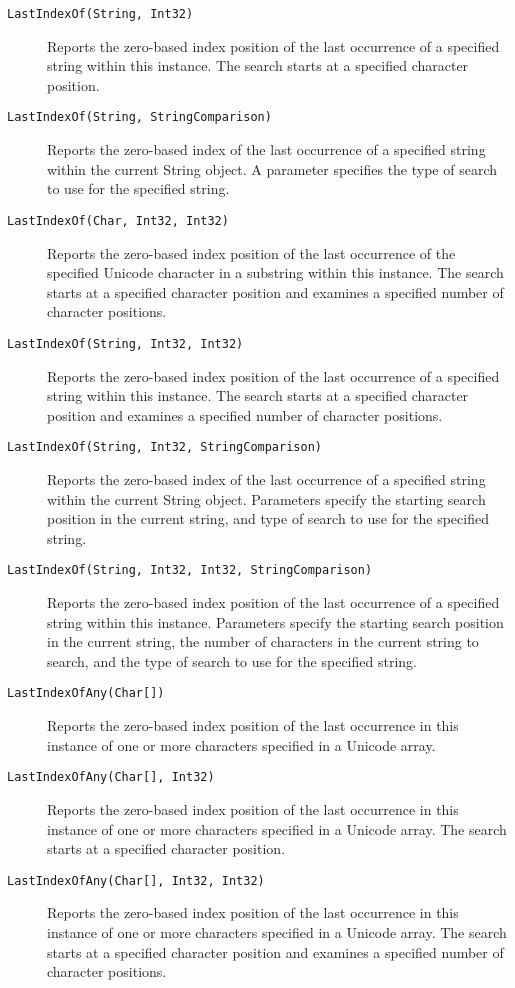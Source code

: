 \begin{description}
\item[\texttt{LastIndexOf(String, Int32)}] Reports the zero-based index position of the last occurrence of a specified string within this instance. The search starts at a specified character position.
\item[\texttt{LastIndexOf(String, StringComparison)}] Reports the zero-based index of the last occurrence of a specified string within the current String object. A parameter specifies the type of search to use for the specified string.
\item[\texttt{LastIndexOf(Char, Int32, Int32)}] Reports the zero-based index position of the last occurrence of the specified Unicode character in a substring within this instance. The search starts at a specified character position and examines a specified number of character positions.
\item[\texttt{LastIndexOf(String, Int32, Int32)}] Reports the zero-based index position of the last occurrence of a specified string within this instance. The search starts at a specified character position and examines a specified number of character positions.
\item[\texttt{LastIndexOf(String, Int32, StringComparison)}] Reports the zero-based index of the last occurrence of a specified string within the current String object. Parameters specify the starting search position in the current string, and type of search to use for the specified string.
\item[\texttt{LastIndexOf(String, Int32, Int32, StringComparison)}] Reports the zero-based index position of the last occurrence of a specified string within this instance. Parameters specify the starting search position in the current string, the number of characters in the current string to search, and the type of search to use for the specified string.
\item[\texttt{LastIndexOfAny(Char[])}] Reports the zero-based index position of the last occurrence in this instance of one or more characters specified in a Unicode array.
\item[\texttt{LastIndexOfAny(Char[], Int32)}] Reports the zero-based index position of the last occurrence in this instance of one or more characters specified in a Unicode array. The search starts at a specified character position.
\item[\texttt{LastIndexOfAny(Char[], Int32, Int32)}] Reports the zero-based index position of the last occurrence in this instance of one or more characters specified in a Unicode array. The search starts at a specified character position and examines a specified number of character positions.

\end{description}
